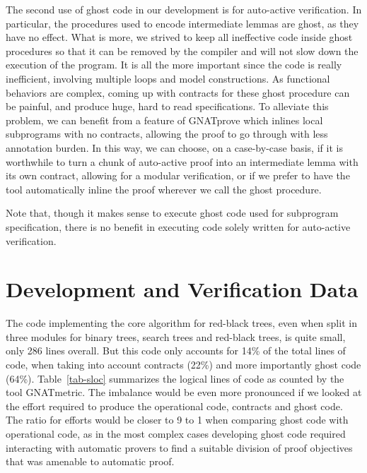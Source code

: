 \documentclass{llncs}
\newcommand{\gnatprove}{GNATprove\xspace}
\begin{document}
The second use of ghost code in our development is for auto-active verification. In particular, the procedures
used to encode intermediate lemmas are ghost, as they have no effect. What is more, we strived to
keep all ineffective code inside ghost procedures so that it can be removed by the compiler and will not
slow down the execution of the program. It is all the more important since the code is really inefficient, involving
multiple loops and model constructions. As functional behaviors are complex, coming up with contracts for
these ghost procedure can be painful, and produce huge, hard to read specifications. To alleviate this
problem, we can benefit from a feature of \gnatprove which inlines local subprograms with no contracts, allowing
the proof to go through with less annotation burden. In this way, we can choose, on a case-by-case basis, if
it is worthwhile to turn a chunk of auto-active proof into an intermediate lemma with its own contract,
allowing for a modular verification, or if we prefer to have the tool automatically inline the
proof wherever we call the ghost procedure.

Note that, though it makes sense to execute ghost code used for subprogram specification, there is no benefit in
executing code solely written for auto-active verification.

\section{Development and Verification Data}

The code implementing the core algorithm for red-black trees, even when split
in three modules for binary trees, search trees and red-black trees, is quite
small, only 286 lines overall. But this code only accounts for 14\% of the
total lines of code, when taking into account contracts (22\%) and more
importantly ghost code (64\%). Table~\ref{tab-sloc} summarizes the logical
lines of code as counted by the tool GNATmetric. The imbalance would be even
more pronounced if we looked at the effort required to produce the operational
code, contracts and ghost code. The ratio for efforts would be closer to 9 to 1
when comparing ghost code with operational code, as in the most complex cases
developing ghost code required interacting with automatic provers to find a
suitable division of proof objectives that was amenable to automatic proof.
\end{document}
